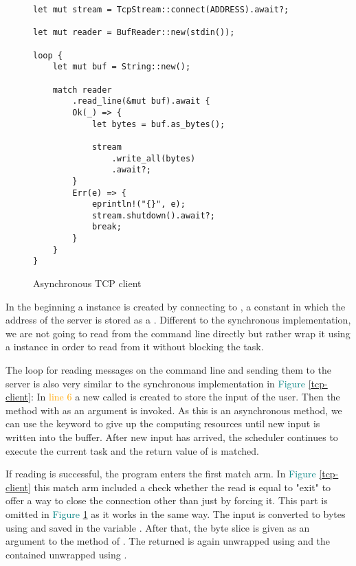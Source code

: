 \begin{figure}[ht]
    \begin{verbatim}
let mut stream = TcpStream::connect(ADDRESS).await?;

let mut reader = BufReader::new(stdin());

loop {
    let mut buf = String::new();

    match reader
        .read_line(&mut buf).await {
        Ok(_) => {
            let bytes = buf.as_bytes();

            stream
                .write_all(bytes)
                .await?;
        }
        Err(e) => {
            eprintln!("{}", e);
            stream.shutdown().await?;
            break;
        }
    }
}
    \end{verbatim}
    \caption{Asynchronous TCP client}
    \label{async-tcp-client}
\end{figure}

In the beginning a  instance is created by connecting to , a constant in
which the address of the server is stored as a . Different to the synchronous implementation, we are not
going to read from the command line directly but rather wrap it using a  instance in order
to read from it without blocking the task.

The loop for reading messages on the command line and sending them to the server is also very similar to the
synchronous implementation in \textcolor{teal}{Figure \ref{tcp-client}}: In \textcolor{orange}{line 6} a new
 called  is created to store the input of the user. Then the  method with
 as an argument is invoked. As this is an asynchronous method, we can use the  keyword to give up
the computing resources until new input is written into the buffer. After new input has arrived, the scheduler
continues to execute the current task and the return value of  is matched.

If reading is successful, the program enters the first match arm. In \textcolor{teal}{Figure \ref{tcp-client}} this
match arm included a check whether the read  is equal to "exit" to offer a way to close the connection
other than just by forcing it. This part is omitted in \textcolor{teal}{Figure \ref{async-tcp-client}} as it works in
the same way. The input is converted to bytes using  and saved in the variable . After that,
the byte slice is given as an argument to the  method of . The returned  is
again unwrapped using  and the contained  unwrapped using .

